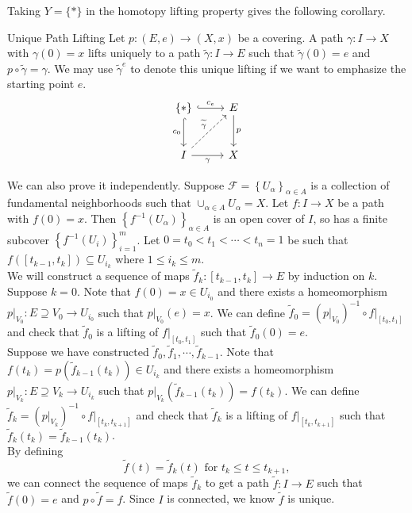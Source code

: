 \documentclass{report}
\begin{document}
Taking $Y=\{*\}$ in the homotopy lifting property gives the following corollary.

\begin{corollary}{Unique Path Lifting}{}
	Let $p: (E,e) \to (X,x)$ be a covering. A path $\gamma: I \to X$ with $\gamma(0)=x$ lifts uniquely to a path $\widetilde{\gamma}: I \to E$ such that $\widetilde{\gamma}(0)=e$ and $p \circ \widetilde{\gamma}=\gamma$. We may use $\widetilde{\gamma}^e$ to denote this unique lifting if we want to emphasize the starting point $e$.
	\[
	\begin{tikzcd}[ampersand replacement=\&]
		\{*\} \arrow[r, "c_e", hook] \arrow[d, "c_0"', hook]                      \& E \arrow[d, "p"] \\ [+8pt]
		 I \arrow[r, "\gamma"'] \arrow[ru, "\widetilde{\gamma}", dashed] \& X               
	\end{tikzcd}
	\]
\end{corollary}

\begin{prf}
	We can also prove it independently. Suppose $\mathcal{F}=\left\{U_\alpha\right\}_{\alpha\in A}$ is a collection of fundamental neighborhoods such that $\cup_{\alpha\in A}U_\alpha=X$. Let $f:I\to X$ be a path with $f(0)=x$. Then $\left\{f^{-1}(U_\alpha)\right\}_{\alpha\in A}$ is an open cover of $I$, so has a finite subcover $\left\{f^{-1}(U_{i})\right\}_{i=1}^m$. Let $0=t_0<t_1<\cdots<t_n=1$ be such that $f([t_{k-1},t_k])\subseteq U_{i_k}$ where $1\le i_k \le m$. \\
	We will construct a sequence of maps $\widetilde{f}_k:[t_{k-1},t_k]\to E$ by induction on $k$. Suppose $k=0$. Note that $f(0)=x\in U_{i_0}$ and there exists a homeomorphism $\left.p\right|_{V_0}: E\supseteq V_0\to U_{i_0}$ such that $\left.p\right|_{V_0}(e)=x$. We can define $\widetilde{f}_0=\left(\left.p\right|_{V_0}\right)^{-1}\circ f|_{[t_0,t_1]}$ and check that $\widetilde{f}_0$ is a lifting of $f|_{[t_0,t_1]}$ such that $\widetilde{f}_0(0)=e$. \\
	Suppose we have constructed $\widetilde{f}_0,\widetilde{f}_1,\cdots,\widetilde{f}_{k-1}$. Note that $f(t_{k})=p\left(\widetilde{f}_{k-1}(t_k)\right)\in U_{i_k}$ and there exists a homeomorphism $\left.p\right|_{V_k}: E\supseteq V_k\to U_{i_k}$ such that $\left.p\right|_{V_{k}}\left(\widetilde{f}_{k-1}(t_k)\right)=f(t_k)$. We can define $\widetilde{f}_k=\left(\left.p\right|_{V_k}\right)^{-1}\circ f|_{[t_k,t_{k+1}]}$ and check that $\widetilde{f}_k$ is a lifting of $f|_{[t_k,t_{k+1}]}$ such that $\widetilde{f}_k(t_{k})=\widetilde{f}_{k-1}(t_{k})$. \\
	By defining 
	\[
		\widetilde{f}(t)=\widetilde{f}_k(t)\text{ for }t_{k}\le t\le t_{k+1},	
	\]
	we can connect the sequence of maps $\widetilde{f}_k$ to get a path $\widetilde{f}:I\to E$ such that $\widetilde{f}(0)=e$ and $p\circ \widetilde{f}=f$. Since $I$ is connected, we know $\widetilde{f}$ is unique.
\end{prf}
\end{document}
